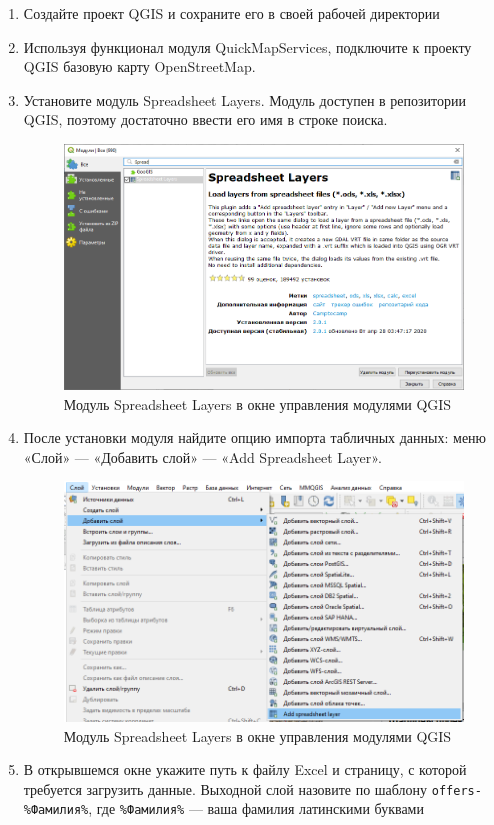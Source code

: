 \documentclass[
  12pt,
]{book}
\begin{document}
\begin{enumerate}
\def\labelenumi{\arabic{enumi}.}
\item
  Создайте проект QGIS и сохраните его в своей рабочей директории
\item
  Используя функционал модуля QuickMapServices, подключите к проекту QGIS базовую карту OpenStreetMap.
\item
  Установите модуль Spreadsheet Layers. Модуль доступен в репозитории QGIS, поэтому достаточно ввести его имя в строке поиска.

  \begin{figure}
  \centering
  \includegraphics{images/Ex08_Geocoding/Spreadsheet01.png}
  \caption{Модуль Spreadsheet Layers в окне управления модулями QGIS}
  \end{figure}
\item
  После установки модуля найдите опцию импорта табличных данных: меню «Слой» --- «Добавить слой» --- «Add Spreadsheet Layer».

  \begin{figure}
  \centering
  \includegraphics{images/Ex08_Geocoding/Spreadsheet02.png}
  \caption{Модуль Spreadsheet Layers в окне управления модулями QGIS}
  \end{figure}
\item
  В открывшемся окне укажите путь к файлу Excel и страницу, с которой требуется загрузить данные. Выходной слой назовите по шаблону \texttt{offers-\%Фамилия\%}, где \texttt{\%Фамилия\%} --- ваша фамилия латинскими буквами


\end{enumerate}
\end{document}
